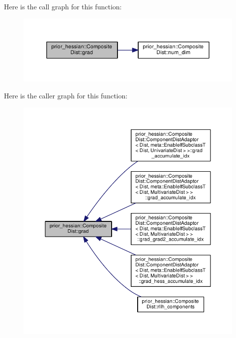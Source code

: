 Here is the call graph for this function\+:\nopagebreak
\begin{figure}[H]
\begin{center}
\leavevmode
\includegraphics[width=350pt]{classprior__hessian_1_1CompositeDist_aaa6bfd95f5914c0f68d67cd97ff40db3_cgraph}
\end{center}
\end{figure}




Here is the caller graph for this function\+:\nopagebreak
\begin{figure}[H]
\begin{center}
\leavevmode
\includegraphics[width=350pt]{classprior__hessian_1_1CompositeDist_aaa6bfd95f5914c0f68d67cd97ff40db3_icgraph}
\end{center}
\end{figure}


